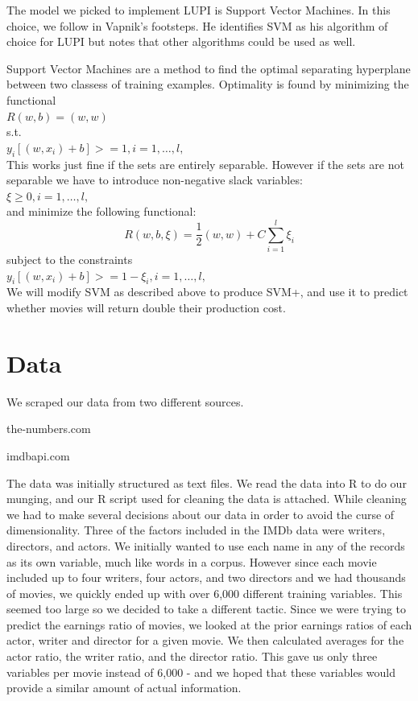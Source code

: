 \documentclass[twoside]{article}\usepackage[]{graphicx}\usepackage[]{color}
\begin{document}
\begin{multicols}{2}
The model we picked to implement LUPI is Support Vector Machines. In this choice,
we follow in Vapnik's footsteps. He identifies SVM as his algorithm of choice
for LUPI but notes that other algorithms could be used as well.\cite{Vapnik2009544}

Support Vector Machines are a method to find the optimal separating hyperplane between
two classess of training examples.\cite{Boser:1992:TAO:130385.130401} Optimality is
found by minimizing the functional\\
$R(w,b) = (w,w)$\\
s.t.\\
$y_i[(w,x_i) + b] >= 1, i = 1,\dots,l,$ \\
This works just fine if the sets are entirely separable. However if the sets are not separable
we have to introduce non-negative slack variables: \\
$\xi \ge 0, i = 1,\dots,l,$ \\
and minimize the following functional: 
\[
R(w,b,\xi) = \frac{1}{2}(w,w) + C\sum\limits^l_{i=1}{\xi_i}
\]
subject to the constraints \\
$y_i[(w,x_i) + b] >= 1 - \xi_i, i = 1,\dots,l,$ \\
We will modify SVM as described above to produce SVM+, and use it to predict whether movies
will return double their production cost.
\section{Data}
We scraped our data from two different sources.
\begin{compactitem}
\item the-numbers.com
\item imdbapi.com
\end{compactitem}
The data was initially structured as text files. We read the data into R to do our
munging, and our R script used for cleaning the data is attached. While cleaning
we had to make several decisions about our data in order to avoid the curse of
dimensionality. Three of the factors included in the IMDb data were writers,
directors, and actors. We initially wanted to use each name in any of the records
as its own variable, much like words in a corpus. However since
each movie included up to four writers, four actors, and 
two directors and we had thousands of movies, we quickly ended up with over 6,000
different training variables. This seemed too large so we decided to take a different
tactic. Since we were trying to predict the earnings ratio of movies, we looked
at the prior earnings ratios of each actor, writer and director for a given movie.
We then calculated averages for the actor ratio, the writer ratio, and the director
ratio. This gave us only three variables per movie instead of 6,000 - and we hoped
that these variables would provide a similar amount of actual information.


\end{multicols}
\end{document}
